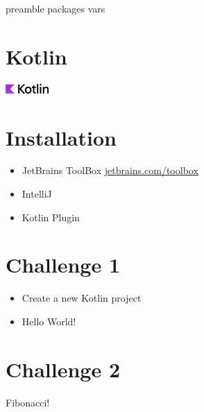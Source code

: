 \RequirePackage{import}
{preamble}
{packages}
{vars}


    \section{Kotlin}\label{sec:kotlin}
    \begin{frame}[c]
        \centering
        \Large
        \includegraphics[scale=3]{../pictures/Kotlin-logo-2021_svg-tex.pdf}
        \linebreak
    \end{frame}

    \section{Installation}\label{sec:installation}
    \begin{frame}
        \slidehead
        \begin{itemize}[<+->]
            \item JetBrains ToolBox \url{jetbrains.com/toolbox}
            \item IntelliJ
            \item Kotlin Plugin
        \end{itemize}
    \end{frame}


    \section{Challenge 1}\label{sec:challenge_1}
    \begin{frame}
        \slidehead
        \begin{itemize}[<+->]
            \item Create a new Kotlin project
            \item Hello World!
        \end{itemize}
    \end{frame}

    \section{Challenge 2}\label{sec:challenge_2}
    \begin{frame}
        \slidehead
        \Large
        Fibonacci!
    \end{frame}

